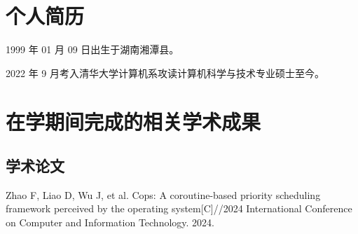 
\begin{resume}

  \section*{个人简历}

  1999 年 01 月 09 日出生于湖南湘潭县。

  2022 年 9 月考入清华大学计算机系攻读计算机科学与技术专业硕士至今。

  \section*{在学期间完成的相关学术成果}

  \subsection*{学术论文}

  \begin{achievements}

    \item Zhao F, Liao D, Wu J, et al. Cops: A coroutine-based priority scheduling framework perceived by the operating system[C]//2024 International Conference on Computer and Information Technology. 2024.
  \end{achievements}



\end{resume}
